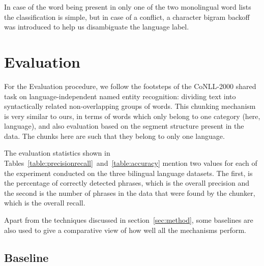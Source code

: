 \documentclass[11pt]{article}
\begin{document}
In case of the word being present in only one of the two monolingual word lists the classification is simple, 
but in case of a conflict, a character bigram backoff was introduced to help us disambiguate the language label. 




\vspace{-0.132cm}
\section{Evaluation}
\vspace{-0.132cm}
\label{sec:eval}

For the Evaluation procedure, we follow the footsteps of the CoNLL-2000 shared task on language-independent 
named entity recognition: dividing text into syntactically related non-overlapping groups of words. This 
chunking mechanism \cite{tjong2003introduction} is very similar to ours, in terms of words which only belong to 
one category (here, language), and also evaluation based on the segment structure present in the data. The chunks 
here are such that they belong to only one language. 

The evaluation statistics shown 
in Tables~\ref{table:precisionrecall}~and~\ref{table:accuracy} mention two values for each of the experiment conducted on the three bilingual 
language datasets. The first, is the percentage of correctly detected phrases, which is the overall precision and the second is the 
number of phrases in the data that were found by the chunker, which is the overall recall. 

Apart from the techniques discussed in section~\ref{sec:method}, some baselines are also used to give a comparative view of how well all the mechanisms perform.

\subsection{Baseline}
\vspace{-0.132cm}
\label{baseline}
\end{document}
